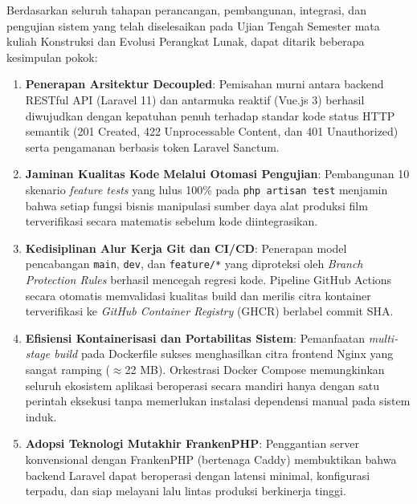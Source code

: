 \documentclass[a4paper,oneside,11pt]{book}
\begin{document}
Berdasarkan seluruh tahapan perancangan, pembangunan, integrasi, dan pengujian sistem yang telah diselesaikan pada Ujian Tengah Semester mata kuliah Konstruksi dan Evolusi Perangkat Lunak, dapat ditarik beberapa kesimpulan pokok:
\begin{enumerate}
\item \textbf{Penerapan Arsitektur Decoupled}: Pemisahan murni antara backend RESTful API (Laravel 11) dan antarmuka reaktif (Vue.js 3) berhasil diwujudkan dengan kepatuhan penuh terhadap standar kode status HTTP semantik (201 Created, 422 Unprocessable Content, dan 401 Unauthorized) serta pengamanan berbasis token Laravel Sanctum.
\item \textbf{Jaminan Kualitas Kode Melalui Otomasi Pengujian}: Pembangunan 10 skenario \textit{feature tests} yang lulus 100\% pada \texttt{php artisan test} menjamin bahwa setiap fungsi bisnis manipulasi sumber daya alat produksi film terverifikasi secara matematis sebelum kode diintegrasikan.
\item \textbf{Kedisiplinan Alur Kerja Git dan CI/CD}: Penerapan model pencabangan \texttt{main}, \texttt{dev}, dan \texttt{feature/*} yang diproteksi oleh \textit{Branch Protection Rules} berhasil mencegah regresi kode. Pipeline GitHub Actions secara otomatis memvalidasi kualitas build dan merilis citra kontainer terverifikasi ke \textit{GitHub Container Registry} (GHCR) berlabel commit SHA.
\item \textbf{Efisiensi Kontainerisasi dan Portabilitas Sistem}: Pemanfaatan \textit{multi-stage build} pada Dockerfile sukses menghasilkan citra frontend Nginx yang sangat ramping ($\approx$22 MB). Orkestrasi Docker Compose memungkinkan seluruh ekosistem aplikasi beroperasi secara mandiri hanya dengan satu perintah eksekusi tanpa memerlukan instalasi dependensi manual pada sistem induk.
\item \textbf{Adopsi Teknologi Mutakhir FrankenPHP}: Penggantian server konvensional dengan FrankenPHP (bertenaga Caddy) membuktikan bahwa backend Laravel dapat beroperasi dengan latensi minimal, konfigurasi terpadu, dan siap melayani lalu lintas produksi berkinerja tinggi.
\end{enumerate}
\end{document}
